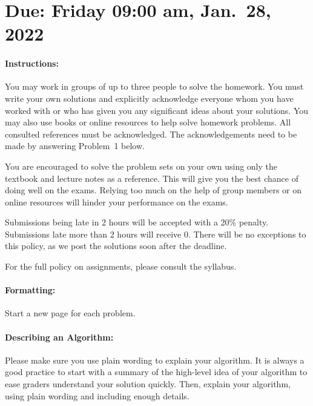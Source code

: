 \documentclass[11pt]{article}
\begin{document}
\maketitle

\section*{Due: Friday 09:00 am, Jan.\ 28, 2022}

\paragraph*{Instructions:}

You may work in groups of up to three people to solve the homework.
You must write your own solutions and explicitly acknowledge everyone whom 
you have worked with or who has given you any significant ideas about your solutions. 
You may also use books or online resources to help solve homework problems.  
All consulted references must be acknowledged. The acknowledgements need to be made by answering Problem~1 below.

You are encouraged to solve the problem sets on your own using only the textbook and lecture notes as a reference. This will give you the best chance of doing well on the exams. Relying too much on the help of group members or on online resources will hinder your performance on the exams.

Submissions being late in 2 hours will be accepted with a 20\% penalty. Submissions late more than 2 hours will receive 0. There will be no exceptions to this policy, as we post the solutions soon after the deadline. 

For the full policy on assignments, please consult the syllabus.

\paragraph*{Formatting:} Start a new page for each problem.

\paragraph*{Describing an Algorithm:} Please make sure you use plain wording to explain your algorithm. It is always a good practice to start with a summary of the high-level idea of your algorithm to ease graders understand your solution quickly. Then, explain your algorithm, using plain wording and including enough details.
\end{document}
